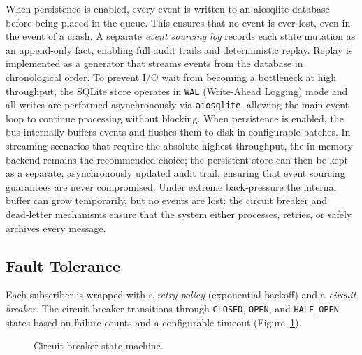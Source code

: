 When persistence is enabled, every event is written to an aiosqlite database
before being placed in the queue.  This ensures that no event is ever lost,
even in the event of a crash.  A separate \emph{event sourcing log} records
each state mutation as an append-only fact, enabling full audit trails and
deterministic replay.  Replay is implemented as a generator that streams
events from the database in chronological order. To prevent I/O wait from becoming a bottleneck at high throughput,
the SQLite store operates in \texttt{WAL} (Write‑Ahead Logging) mode
and all writes are performed asynchronously via \texttt{aiosqlite},
allowing the main event loop to continue processing without blocking.
When persistence is enabled, the bus internally buffers events and
flushes them to disk in configurable batches.  In streaming scenarios
that require the absolute highest throughput, the in‑memory backend
remains the recommended choice; the persistent store can then be kept
as a separate, asynchronously updated audit trail, ensuring that event
sourcing guarantees are never compromised. 
Under extreme back‑pressure the internal buffer can grow temporarily,
but no events are lost: the circuit breaker and dead‑letter mechanisms
ensure that the system either processes, retries, or safely archives
every message.

\subsection{Fault Tolerance}

Each subscriber is wrapped with a \emph{retry policy} (exponential backoff)
and a \emph{circuit breaker}.  The circuit breaker transitions through
\texttt{CLOSED}, \texttt{OPEN}, and \texttt{HALF\_OPEN} states based on
failure counts and a configurable timeout (Figure~\ref{fig:circuit}).

\begin{figure}[htbp]
\centering
{}
\caption{Circuit breaker state machine.}
\label{fig:circuit}
\end{figure}

